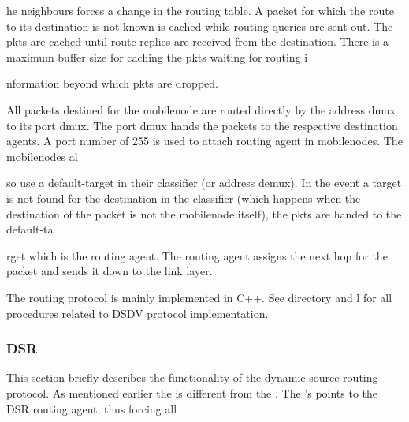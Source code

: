 he neighbours forces a change in the routing table.
A packet for which the route to its destination is not known is cached while routing queries are sent out. The pkts are cached until route-replies are received from the destination. There is a maximum buffer size for caching the pkts waiting for routing i











nformation beyond which pkts are dropped.

All packets destined for the mobilenode are routed directly by the address dmux to its port dmux. The port dmux hands the packets to the respective destination agents. A port number of 255 is used to attach routing agent in mobilenodes. The mobilenodes al











so use a default-target in their classifier (or address demux). In the event a target is not found for the destination in the classifier (which happens when the destination of the packet is not the mobilenode itself), the pkts are handed to the default-ta











rget which is the routing agent. The routing agent assigns the next hop for the packet and sends it down to the link layer.

The routing protocol is mainly implemented in C++. See  directory and l for all procedures related to DSDV protocol implementation.


\subsubsection{DSR}
\label{sec:dsr}

This section briefly describes the functionality of the dynamic source routing protocol. As mentioned earlier the  is different from the .  The 's  points to the DSR routing agent, thus forcing all 











